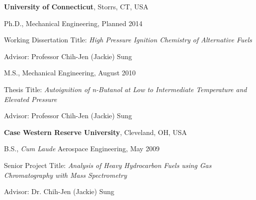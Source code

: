 \textbf{University of Connecticut}, Storrs, CT, USA
\begin{outerlist}

\item[] Ph.D., Mechanical Engineering, Planned 2014
        \begin{innerlist}
        \item[] Working Dissertation Title: \emph{High Pressure Ignition Chemistry of Alternative Fuels}
        \item[] Advisor: Professor Chih-Jen (Jackie) Sung
        \end{innerlist}

\item[] M.S., Mechanical Engineering, August 2010
        \begin{innerlist}
        \item[] Thesis Title: \emph{Autoignition of n-Butanol at Low to Intermediate Temperature and Elevated Pressure}
        \item[] Advisor: Professor Chih-Jen (Jackie) Sung
        \end{innerlist}

\end{outerlist}
\vspace{0.1in}
\textbf{Case Western Reserve University}, Cleveland, OH, USA
\begin{outerlist}

\item[] B.S., \emph{Cum Laude} Aerospace Engineering, May 2009
        \begin{innerlist}
        \item[] Senior Project Title: \emph{Analysis of Heavy Hydrocarbon Fuels using Gas Chromatography with Mass Spectrometry}
        \item[] Advisor: Dr. Chih-Jen (Jackie) Sung
        \end{innerlist}

\end{outerlist}

%

